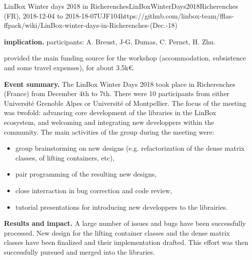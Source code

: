\begin{event}{ LinBox Winter days 2018 in Richerenches}{LinBoxWinterDays2018}{Richerenches (FR),
2018-12-04 to 2018-18-07}{UJF}{10}{4}{https://github.com/linbox-team/fflas-ffpack/wiki/LinBox-winter-days-in-Richerenches-(Dec.-18)}

\textbf{\ODK implication.} \ODK participants: A. Breust, J-G. Dumas, C. Pernet, H. Zhu.

\ODK provided the main funding source for the workshop (accommodation,
subsistence and some travel expenses), for about 3.5k\euro.

\textbf{Event summary.} The LinBox Winter Days 2018 took place in Richerenches
(France) from December 4th to 7th.
There were 10 participants from either Université Grenoble Alpes or Université of Montpellier. The focus of the meeting
was twofold: advancing core development of the libraries in the LinBox ecosystem, and welcoming and integrating new
developpers within the community. The main activities of the group during the meeting were:
\begin{itemize}
\item group brainstorming on new designs (e.g. refactorization of the dense matrix classes, of lifting containers, etc),
\item pair programming of the resulting new designs,
\item close interraction in bug correction and code review,
\item tutorial presentations for introducing new developpers to the librairies.
\end{itemize}

\textbf{Results and impact.} A large number of issues and bugs have been successfully processed. New design for the
lifting container classes and the dense matrix classes have been finalized and their implementation drafted. This effort
was then successfully pursued and merged into the libraries.

\end{event}
